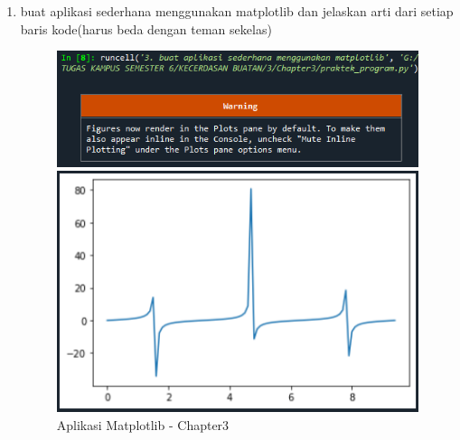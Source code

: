 \begin{enumerate}
    \item buat aplikasi sederhana menggunakan matplotlib dan jelaskan arti dari setiap baris kode(harus beda dengan teman sekelas)
          \begin{figure}[ht]
              \centerline{\includegraphics[scale=0.7]{figures/chapter3-3.png}}
              \centerline{\includegraphics[scale=0.7]{figures/chapter3-3a.png}}
              \caption{Aplikasi Matplotlib - Chapter3}
              \label{Aplikasi Matplotlib - Chapter3}
          \end{figure}


\end{enumerate}
